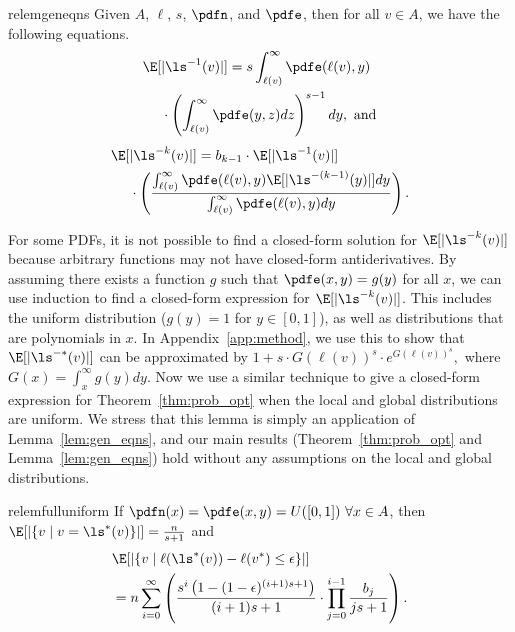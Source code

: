 \begin{restatable}{relem}{geneqns}\label{lem:gen_eqns}
Given $A$, $\ell$, $s$, $\pdfn$, and $\pdfe$,
then for all $v\in A$, we have the following equations.
\begin{align}
&\E[|\ls^{-1}(v)|]=s\int_{\ell(v)}^\infty \pdfe(\ell(v), y)\label{eq:e1}\\
&\quad~\cdot\left(\int_{\ell(v)}^\infty 
\pdfe(y,z)dz\right)^{s-1}dy,~\text{and}\nonumber
\end{align}
\begin{align}
&\E[|\ls^{-k}(v)|]=b_{k-1}\cdot \E[|\ls^{-1}(v)|]\label{eq:ex}\\
&\quad~\cdot\left(\frac{\int_{\ell(v)}^\infty \pdfe(\ell(v),y)\E[|\ls^{-(k-1)}(y)|]dy}
{\int_{\ell(v)}^\infty \pdfe(\ell(v),y)dy}\right).\nonumber
\end{align}
\end{restatable}

For some PDFs, it is not possible to find a closed-form solution
for $\E[|\ls^{-k}(v)|]$ because arbitrary 
functions may not have closed-form antiderivatives.
By assuming there exists a function $g$ such that $\pdfe(x,y)=g(y)$ for all $x$,
we can use induction to find a closed-form expression for $\E[|\ls^{-k}(v)|]$.
This includes the uniform distribution ($g(y)=1$ for $y\in [0,1]$),
as well as distributions that are polynomials in $x$.
In Appendix~\ref{app:method}, 
we use this to show that $\E[|\ls^{-*}(v)|]$
can be approximated by $1+s\cdot G(\ell(v))^s\cdot e^{G(\ell(v))^s},$
where $G(x)=\int_x^\infty g(y)dy.$
Now we use a similar technique to give a closed-form expression for Theorem~\ref{thm:prob_opt}
when the local and global distributions are uniform.
We stress that this lemma is simply an application of Lemma~\ref{lem:gen_eqns},
and our main results (Theorem~\ref{thm:prob_opt} and Lemma~\ref{lem:gen_eqns})
hold without any assumptions on the local and global distributions.

\begin{restatable}{relem}{fulluniform}\label{lem:full_uniform}
If $\pdfn(x)=\pdfe(x,y)=U([0,1])~\forall x\in A$,
then $\E[|\{v\mid v=\ls^*(v)\}|]=\frac{n}{s+1}$ and
\begin{align*}
&\E[|\{v\mid \ell(\ls^*(v))-\ell(v^*)\leq\epsilon\}|]\\
&=n \sum_{i=0}^\infty \left(\frac{s^i\left(1-(1-\epsilon)^{(i+1)s+1}\right)}{(i+1)s+1}
\cdot\prod_{j=0}^{i-1}\frac{b_j}{js+1}\right).
\end{align*}
\end{restatable}

